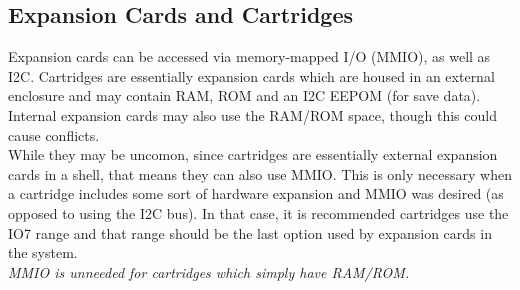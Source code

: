 \subsection{Expansion Cards and Cartridges}

Expansion cards can be accessed via memory-mapped I/O (MMIO), as well as I2C.
Cartridges are essentially expansion cards which are housed in an external
enclosure and may contain RAM, ROM and an I2C EEPOM (for save data). Internal
expansion cards may also use the RAM/ROM space, though this could cause
conflicts.\\

While they may be uncomon, since cartridges are essentially external expansion
cards in a shell, that means they can also use MMIO. This is only necessary
when a cartridge includes some sort of hardware expansion and MMIO was desired
(as opposed to using the I2C bus). In that case, it is recommended cartridges
use the IO7 range and that range should be the last option used by expansion
cards in the system.\\

\emph{MMIO is unneeded for cartridges which simply have RAM/ROM.}\\

